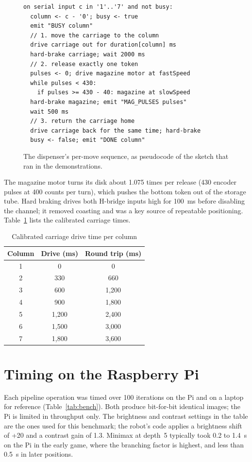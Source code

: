 \documentclass[conference]{IEEEtran}
\begin{document}
\begin{figure}[t]
\begin{lstlisting}
on serial input c in '1'..'7' and not busy:
  column <- c - '0'; busy <- true
  emit "BUSY column"
  // 1. move the carriage to the column
  drive carriage out for duration[column] ms
  hard-brake carriage; wait 2000 ms
  // 2. release exactly one token
  pulses <- 0; drive magazine motor at fastSpeed
  while pulses < 430:
    if pulses >= 430 - 40: magazine at slowSpeed
  hard-brake magazine; emit "MAG_PULSES pulses"
  wait 500 ms
  // 3. return the carriage home
  drive carriage back for the same time; hard-brake
  busy <- false; emit "DONE column"
\end{lstlisting}
\caption{The dispenser's per-move sequence, as pseudocode of the sketch that ran in the demonstrations.}
\label{fig:sequence}
\end{figure}

The magazine motor turns its disk about 1.075 times per release (430 encoder pulses at 400 counts per turn), which pushes the bottom token out of the storage tube. Hard braking drives both H-bridge inputs high for 100~ms before disabling the channel; it removed coasting and was a key source of repeatable positioning. Table~\ref{tab:carriage} lists the calibrated carriage times.

\begin{table}[t]
\caption{Calibrated carriage drive time per column}
\label{tab:carriage}
\centering
\small
\begin{tabular}{ccc}
\toprule
\textbf{Column} & \textbf{Drive (ms)} & \textbf{Round trip (ms)} \\
\midrule
1 & 0 & 0 \\
2 & 330 & 660 \\
3 & 600 & 1,200 \\
4 & 900 & 1,800 \\
5 & 1,200 & 2,400 \\
6 & 1,500 & 3,000 \\
7 & 1,800 & 3,600 \\
\bottomrule
\end{tabular}
\end{table}

\section{Timing on the Raspberry Pi}
Each pipeline operation was timed over 100 iterations on the Pi and on a laptop for reference (Table~\ref{tab:bench}). Both produce bit-for-bit identical images; the Pi is limited in throughput only. The brightness and contrast settings in the table are the ones used for this benchmark; the robot's code applies a brightness shift of +20 and a contrast gain of 1.3. Minimax at depth~5 typically took 0.2 to 1.4~s on the Pi in the early game, where the branching factor is highest, and less than 0.5~s in later positions.
\end{document}
